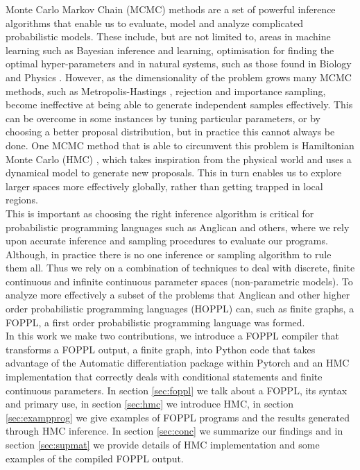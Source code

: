 \documentclass[twoside]{article}
\begin{document}
Monte Carlo Markov Chain (MCMC) methods are a set of powerful inference algorithms \citep{berg2008markov} that enable us to evaluate, model and analyze complicated probabilistic models. These include, but are not limited to, areas in machine learning such as Bayesian inference and learning, optimisation for finding the optimal hyper-parameters \citep{andrieu2003introduction} and in natural systems, such as those found in Biology \citep{sorensen2007likelihood} and Physics \citep{duane1987hybrid}. 
However, as the dimensionality of the problem grows many MCMC methods, such as Metropolis-Hastings \citep{hastings1970monte}, rejection and importance sampling,  become ineffective at being able to generate independent samples effectively. This can be overcome in some instances by tuning particular parameters, or by choosing a better proposal distribution, but in practice this cannot always be done. One MCMC method that is able to circumvent this problem is Hamiltonian Monte Carlo (HMC) \citep{neal2011mcmc}\citep{duane1987hybrid}, which takes inspiration from the physical world and uses a dynamical model to generate new proposals. This in turn enables us to explore larger spaces more effectively globally, rather than getting trapped in local regions. \\
This is important as choosing the right inference algorithm is critical for probabilistic programming languages \citep{tolpin2015probabilistic} such as Anglican \citep{wood2014new} and others, where we rely upon accurate inference and sampling procedures to evaluate our programs. Although, in practice there is no one inference or sampling algorithm to rule them all. Thus we rely on a combination of techniques to deal with discrete, finite continuous and infinite continuous parameter spaces (non-parametric models). To analyze more effectively a subset of the problems that Anglican and other higher order probabilistic programming languages (HOPPL) can, such as finite graphs, a FOPPL, a first order probabilistic programming language was formed.\\

In this work we make two contributions, we introduce a FOPPL compiler that transforms a FOPPL output, a finite graph, into Python code that takes advantage of the Automatic differentiation package within Pytorch \citep{pytorch} and an HMC implementation that correctly deals with conditional statements and finite continuous parameters.
In section \ref{sec:foppl} we talk about a FOPPL, its syntax and primary use, in section \ref{sec:hmc} we introduce HMC, in section \ref{sec:exampprog} we give examples of FOPPL programs and the results generated through HMC inference. In section \ref{sec:conc} we summarize our findings and in section \ref{sec:supmat} we provide details of HMC implementation and some examples of the compiled FOPPL output. 
\end{document}
